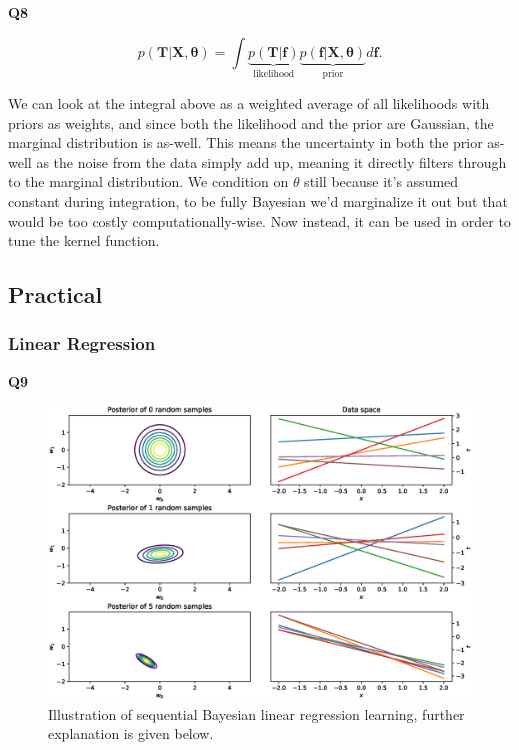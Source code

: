 \documentclass[a4paper]{article}
\begin{document}
\noindent\textbf{Q8}

\noindent\makebox[\linewidth]{\rule{\textwidth}{0.4pt}}

 \begin{equation*}
p(\mathbf{T}\vert\mathbf{X,\theta})=\int \underbrace{p(\mathbf{T}\vert\mathbf{f})}_{\text{likelihood}}\underbrace{p(\mathbf{f}\vert \mathbf{X,\theta})}_{\text{prior}}d\mathbf{f}.
\end{equation*}

\noindent We can look at the integral above as a weighted average of all likelihoods with priors as weights, and since both the likelihood and the prior are Gaussian, the marginal distribution is as-well. This means the uncertainty in both the prior as-well as the noise from the data simply add up, meaning it directly filters through to the marginal distribution. We condition on $\theta$ still because it's assumed constant during integration, to be fully Bayesian we'd marginalize it out but that would be too costly computationally-wise. Now instead, it can be used in order to tune the kernel function.

\newpage

\subsection{Practical}

\subsubsection{Linear Regression}

\noindent\textbf{Q9}

\noindent\makebox[\linewidth]{\rule{\textwidth}{0.4pt}}

\begin{figure}[H]
	\centering
	\includegraphics[width=1\textwidth]{foo.eps}
	\caption{\label{fig:frog}Illustration of sequential Bayesian linear regression learning, further explanation is given below.}
\end{figure}
\end{document}

